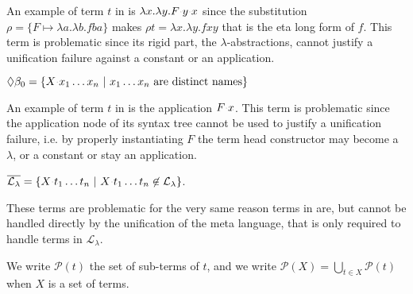 \documentclass[sigconf,natbib=false,review]{acmart}
\newcommand{\appsep}{\ensuremath{\textcolor{lightgray}{\cdot}}}
\newcommand{\llambda}{\ensuremath{\mathcal{L}_\lambda}\xspace}
\begin{document}
\noindent
An example of term $t$ in \maybeeta{} is
$\lambda x.\lambda y.F \appsep y \appsep x$
since the substitution
$\rho = \{ F \mapsto \lambda a.\lambda b.fba\}$
makes $\rho t = \lambda x.\lambda y.f x y$
that is the eta long form of $f$. This term is problematic since
its rigid part, the $\lambda$-abstractions, cannot justify a
unification failure against a constant or an application.

\begin{definition}[\maybebeta]\label{def:maybebeta}
  $\maybebeta = \{ X \appsep x_1 \ldots x_n ~|~ x_1 \ldots x_n ~\mathrm{are~distinct~names} \}$
\end{definition}

\noindent
An example of term $t$ in \maybebeta{} is the application $F \appsep x$.
This term is problematic since the application node of
its syntax tree cannot be used to justify a
unification failure, i.e. by properly instantiating $F$ the term
head constructor may become a $\lambda$, or a constant or stay an application.

\begin{definition}[\notllambda]\label{def:notllambda}
  $\notllambda = \{ X \appsep t_1 \ldots t_n ~|~ X \appsep t_1 \ldots t_n \not\in \llambda \}$.
\end{definition}

\noindent
These terms are problematic for the very same reason terms in \maybebeta are,
but cannot be handled directly by the unification of the meta language, that
is only required to handle terms in \llambda.


\newcommand{\subterm}[1]{\ensuremath{\mathcal{P}(#1)}}
We write $\subterm{t}$ the set of sub-terms of $t$, and
we write $\subterm{X} = \bigcup_{t\in X} \subterm{t}$ when $X$ is a set of terms.
\end{document}
